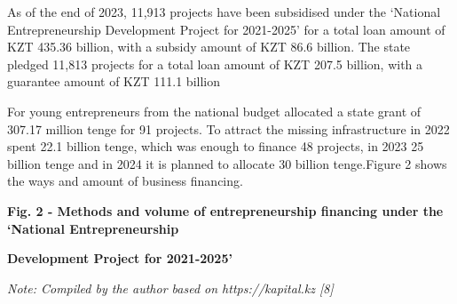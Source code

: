 \begin{multicols}{2}
As of the end of 2023, 11,913 projects have been subsidised under the
`National Entrepreneurship Development Project for 2021-2025' for a
total loan amount of KZT 435.36 billion, with a subsidy amount of KZT
86.6 billion. The state pledged 11,813 projects for a total loan amount
of KZT 207.5 billion, with a guarantee amount of KZT 111.1 billion

For young entrepreneurs from the national budget allocated a state grant
of 307.17 million tenge for 91 projects. To attract the missing
infrastructure in 2022 spent 22.1 billion tenge, which was enough to
finance 48 projects, in 2023 25 billion tenge and in 2024 it is planned
to allocate 30 billion tenge.Figure 2 shows the ways and amount of
business financing.
\end{multicols}

{\bfseries Fig. 2 - Methods and volume of entrepreneurship financing under
the `National Entrepreneurship}

{\bfseries Development Project for 2021-2025'}

\emph{Note: Compiled by the author based on https://kapital.kz {[}8{]}}


